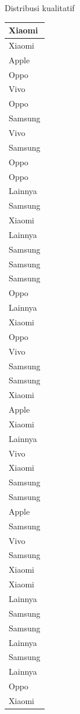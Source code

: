 \documentclass[
  ignorenonframetext,
]{beamer}
\begin{document}
\begin{frame}[s]{Distribusi kualitatif}
\begin{table}
\begin{tabular}[t]{l}
\hline
Xiaomi\\
\hline
Xiaomi\\
\hline
Apple\\
\hline
Oppo\\
\hline
Vivo\\
\hline
Oppo\\
\hline
Samsung\\
\hline
Vivo\\
\hline
Samsung\\
\hline
Oppo\\
\hline
Oppo\\
\hline
Lainnya\\
\hline
Samsung\\
\hline
Xiaomi\\
\hline
Lainnya\\
\hline
Samsung\\
\hline
Samsung\\
\hline
Samsung\\
\hline
Oppo\\
\hline
Lainnya\\
\hline
Xiaomi\\
\hline
Oppo\\
\hline
Vivo\\
\hline
Samsung\\
\hline
Samsung\\
\hline
Xiaomi\\
\hline
Apple\\
\hline
Xiaomi\\
\hline
Lainnya\\
\hline
Vivo\\
\hline
Xiaomi\\
\hline
Samsung\\
\hline
Samsung\\
\hline
Apple\\
\hline
Samsung\\
\hline
Vivo\\
\hline
Samsung\\
\hline
Xiaomi\\
\hline
Xiaomi\\
\hline
Lainnya\\
\hline
Samsung\\
\hline
Samsung\\
\hline
Lainnya\\
\hline
Samsung\\
\hline
Lainnya\\
\hline
Oppo\\
\hline
Xiaomi\\

\end{tabular}
\end{table}
\end{frame}
\end{document}

